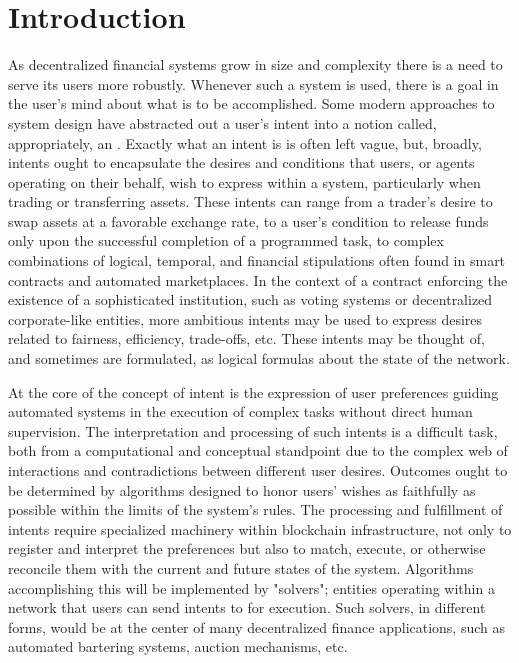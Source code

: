 \section{Introduction}\label{sec:introduction}

As decentralized financial systems grow in size and complexity there is a need to serve its users more robustly. Whenever such a system is used, there is a goal in the user's mind about what is to be accomplished. Some modern approaches to system design have abstracted out a user's intent into a notion called, appropriately, an . Exactly what an intent is is often left vague, but, broadly, intents ought to encapsulate the desires and conditions that users, or agents operating on their behalf, wish to express within a system, particularly when trading or transferring assets. These intents can range from a trader's desire to swap assets at a favorable exchange rate, to a user's condition to release funds only upon the successful completion of a programmed task, to complex combinations of logical, temporal, and financial stipulations often found in smart contracts and automated marketplaces. In the context of a contract enforcing the existence of a sophisticated institution, such as voting systems or decentralized corporate-like entities, more ambitious intents may be used to express desires related to fairness, efficiency, trade-offs, etc. These intents may be thought of, and sometimes are formulated, as logical formulas about the state of the network.

At the core of the concept of intent is the expression of user preferences guiding automated systems in the execution of complex tasks without direct human supervision. The interpretation and processing of such intents is a difficult task, both from a computational and conceptual standpoint due to the complex web of interactions and contradictions between different user desires. Outcomes ought to be determined by algorithms designed to honor users' wishes as faithfully as possible within the limits of the system's rules. The processing and fulfillment of intents require specialized machinery within blockchain infrastructure, not only to register and interpret the preferences but also to match, execute, or otherwise reconcile them with the current and future states of the system. Algorithms accomplishing this will be implemented by "solvers"; entities operating within a network that users can send intents to for execution. Such solvers, in different forms, would be at the center of many decentralized finance applications, such as automated bartering systems, auction mechanisms, etc.

